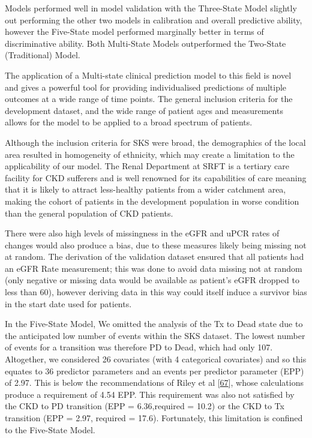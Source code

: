 \documentclass[
]{article}
\begin{document}
Models performed well in model validation with the Three-State Model slightly out performing the other two models in calibration and overall predictive ability, however the Five-State model performed marginally better in terms of discriminative ability. Both Multi-State Models outperformed the Two-State (Traditional) Model.

The application of a Multi-state clinical prediction model to this field is novel and gives a powerful tool for providing individualised predictions of multiple outcomes at a wide range of time points. The general inclusion criteria for the development dataset, and the wide range of patient ages and measurements allows for the model to be applied to a broad spectrum of patients.

Although the inclusion criteria for SKS were broad, the demographics of the local area resulted in homogeneity of ethnicity, which may create a limitation to the applicability of our model. The Renal Department at SRFT is a tertiary care facility for CKD sufferers and is well renowned for its capabilities of care meaning that it is likely to attract less-healthy patients from a wider catchment area, making the cohort of patients in the development population in worse condition than the general population of CKD patients.

There were also high levels of missingness in the eGFR and uPCR rates of changes would also produce a bias, due to these measures likely being missing not at random. The derivation of the validation dataset ensured that all patients had an eGFR Rate measurement; this was done to avoid data missing not at random (only negative or missing data would be available as patient's eGFR dropped to less than 60), however deriving data in this way could itself induce a survivor bias in the start date used for patients.

In the Five-State Model, We omitted the analysis of the Tx to Dead state due to the anticipated low number of events within the SKS dataset. The lowest number of events for a transition was therefore PD to Dead, which had only 107. Altogether, we considered 26 covariates (with 4 categorical covariates) and so this equates to 36 predictor parameters and an events per predictor parameter (EPP) of 2.97. This is below the recommendations of Riley et al {[}\protect\hyperlink{ref-riley_minimum_2019}{67}{]}, whose calculations produce a requirement of 4.54 EPP. This requirement was also not satisfied by the CKD to PD transition (EPP = 6.36,required = 10.2) or the CKD to Tx transition (EPP = 2.97, required = 17.6). Fortunately, this limitation is confined to the Five-State Model.
\end{document}
